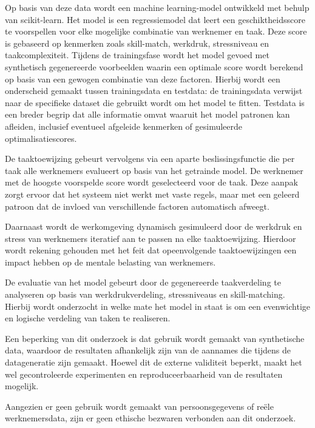 Op basis van deze data wordt een machine learning-model ontwikkeld met behulp van scikit-learn. Het model is een regressiemodel dat leert een geschiktheidsscore te voorspellen voor elke mogelijke combinatie van werknemer en taak. Deze score is gebaseerd op kenmerken zoals skill-match, werkdruk, stressniveau en taakcomplexiteit. Tijdens de trainingsfase wordt het model gevoed met synthetisch gegenereerde voorbeelden waarin een optimale score wordt berekend op basis van een gewogen combinatie van deze factoren. Hierbij wordt een onderscheid gemaakt tussen trainingsdata en testdata: de trainingsdata verwijst naar de specifieke dataset die gebruikt wordt om het model te fitten. Testdata is een breder begrip dat alle informatie omvat waaruit het model patronen kan afleiden, inclusief eventueel afgeleide kenmerken of gesimuleerde optimalisatiescores.

De taaktoewijzing gebeurt vervolgens via een aparte beslissingsfunctie die per taak alle werknemers evalueert op basis van het getrainde model. De werknemer met de hoogste voorspelde score wordt geselecteerd voor de taak. Deze aanpak zorgt ervoor dat het systeem niet werkt met vaste regels, maar met een geleerd patroon dat de invloed van verschillende factoren automatisch afweegt.

Daarnaast wordt de werkomgeving dynamisch gesimuleerd door de werkdruk en stress van werknemers iteratief aan te passen na elke taaktoewijzing. Hierdoor wordt rekening gehouden met het feit dat opeenvolgende taaktoewijzingen een impact hebben op de mentale belasting van werknemers.

De evaluatie van het model gebeurt door de gegenereerde taakverdeling te analyseren op basis van werkdrukverdeling, stressniveaus en skill-matching. Hierbij wordt onderzocht in welke mate het model in staat is om een evenwichtige en logische verdeling van taken te realiseren.

\vspace{1em}Een beperking van dit onderzoek is dat gebruik wordt gemaakt van synthetische data, waardoor de resultaten afhankelijk zijn van de aannames die tijdens de datageneratie zijn gemaakt. Hoewel dit de externe validiteit beperkt, maakt het wel gecontroleerde experimenten en reproduceerbaarheid van de resultaten mogelijk.

Aangezien er geen gebruik wordt gemaakt van persoonsgegevens of reële werknemersdata, zijn er geen ethische bezwaren verbonden aan dit onderzoek.
